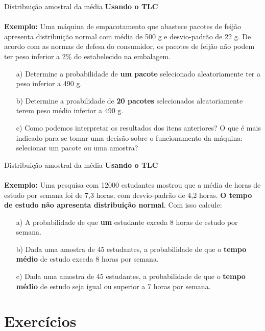 \documentclass[10pt]{beamer}\usepackage[]{graphicx}\usepackage[]{color}
\theoremstyle{definition}
\begin{document}
\begin{frame}{Distribuição amostral da média}
  \textbf{Usando o TLC} \\~\\

  \textbf{Exemplo:} Uma máquina de empacotamento que abastece pacotes de
  feijão apresenta distribuição normal com média de 500 g e
  desvio-padrão de 22 g. De acordo com as normas de defesa do
  consumidor, os pacotes de feijão não podem ter peso inferior a 2\% do
  estabelecido na embalagem.
  \begin{itemize}
  \item[a)] Determine a probabilidade de \textbf{um pacote} selecionado
    aleatoriamente ter a peso inferior a 490 g.
  \item[b)] Determine a proabilidade de \textbf{20 pacotes} selecionados
    aleatoriamente terem peso médio inferior a 490 g.
  \item[c)] Como podemos interpretar os resultados dos itens anteriores?
    O que é mais indicado para se tomar uma decisão sobre o
    funcionamento da máquina: selecionar um pacote ou uma amostra?
  \end{itemize}
\end{frame}

\begin{frame}{Distribuição amostral da média}
  \textbf{Usando o TLC} \\~\\

  \textbf{Exemplo:} Uma pesquisa com 12000 estudantes mostrou que a
  média de horas de estudo por semana foi de 7,3 horas, com
  desvio-padrão de 4,2 horas. \textbf{O tempo de estudo não apresenta
    distribuição normal}. Com isso calcule:
  \begin{itemize}
  \item[a)] A probabilidade de que \textbf{um} estudante exceda 8 horas de
    estudo por semana.
  \item[b)] Dada uma amostra de 45 estudantes, a probabilidade de que o
    \textbf{tempo médio} de estudo exceda 8 horas por semana.
  \item[c)] Dada uma amostra de 45 estudantes, a probabilidade de que o
    \textbf{tempo médio} de estudo seja igual ou superior a 7 horas por
    semana.
  \end{itemize}
\end{frame}

\section{Exercícios}
\end{document}
